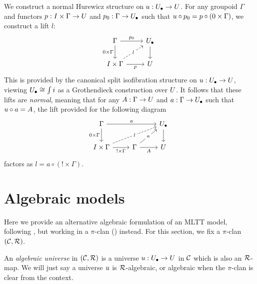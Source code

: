 \begin{definition}
We construct a normal Hurewicz structure on ${u} : {U_\bullet} \to U$.
For any groupoid $\Gamma$ and functors
$p : I \times \Gamma \to U$
and $p_0 : \Gamma \to {U_\bullet}$ such that ${u} \circ p_0 = p \circ (0 \times \Gamma)$,
we construct a lift $l$:
\[ \begin{tikzcd}
	\Gamma & \Ulow \\
	{I \times \Gamma} & \U
	\arrow["{p_0}", from=1-1, to=1-2]
	\arrow["{0 \times \Gamma}"', from=1-1, to=2-1]
	\arrow[from=1-2, to=2-2]
	\arrow["l"{description}, dashed, from=2-1, to=1-2]
	\arrow["p"', from=2-1, to=2-2]
\end{tikzcd}\]
This is provided by the canonical split 
isofibration structure on ${u} : {U_\bullet} \to U$,
viewing ${U_\bullet} \cong \int i$ as a Grothendieck construction over $U$.
It follows that these lifts are \emph{normal},
meaning that for any $A : \Gamma \to U$
and $a : \Gamma \to {U_\bullet}$ such that ${u} \circ a = A$,
the lift provided for the following diagram
\[
\begin{tikzcd}
	\Gamma && \Ulow \\
	{I \times \Gamma} & \Gamma & \U
	\arrow["a", from=1-1, to=1-3]
	\arrow["{0 \times \Gamma}"', from=1-1, to=2-1]
	\arrow[from=1-3, to=2-3]
	\arrow["l"{description}, dashed, from=2-1, to=1-3]
	\arrow["{! \times \Gamma}"', from=2-1, to=2-2]
	\arrow["a"{description}, from=2-2, to=1-3]
	\arrow["A"', from=2-2, to=2-3]
\end{tikzcd}
\]
factors as $l = a \circ (! \times \Gamma)$.
\end{definition}

\section{Algebraic models}\label{sec:StrSem}

Here we provide an alternative algebraic formulation of an MLTT model,
following \cite{awodey2025}, but working in a $\pi$-clan () instead.
For this section, we fix a $\pi$-clan $(\mathcal{C}, \mathcal{R})$.

\begin{definition}
  \label{def:algebraic-universe}
  An \emph{algebraic universe} in $(\mathcal{C},\mathcal{R})$ is a universe ${u} : {U_\bullet} \to U$ in
  $\mathcal{C}$ which is also an $\mathcal{R}$-map.
  We will just say a universe ${u}$ is $\mathcal{R}$-algebraic, or algebraic when the $\pi$-clan
  is clear from the context.
\end{definition}

